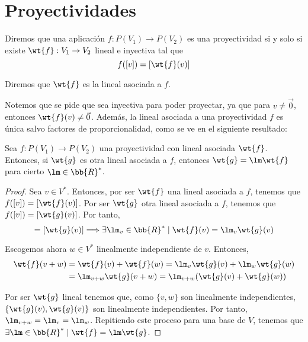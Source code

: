 \section{Proyectividades}

\begin{figure}[H]
    \centering
\end{figure}

\begin{definicion}[Proyectividad]
    Diremos que una aplicación $f:P(V_1)\to P(V_2)$ es una proyectividad si y solo si existe $\wt{f}:V_1\to V_2$ lineal e inyectiva tal que
    \begin{equation*}
        f([v])=[\wt{f}(v)]
    \end{equation*}

    Diremos que $\wt{f}$ es la lineal asociada a $f$.
\end{definicion}
Notemos que se pide que sea inyectiva para poder proyectar, ya que para $v\neq \vec{0}$, entonces $\wt{f}(v)\neq \vec{0}$.
Además, la lineal asociada a una proyectividad $f$ es única salvo factores de proporcionalidad, como se ve en el siguiente resultado:
\begin{prop}
    Sea $f:P(V_1)\to P(V_2)$ una proyectividad con lineal asociada $\wt{f}$.
    Entonces, si $\wt{g}$ es otra lineal asociada a $f$, entonces $\wt{g}=\lm \wt{f}$ para cierto $\lm \in \bb{R}^\ast$.
\end{prop}
\begin{proof}
    Sea $v\in V^\ast$. Entonces, por ser $\wt{f}$ una lineal asociada a $f$, tenemos que $f([v])=[\wt{f}(v)]$.
    Por ser $\wt{g}$ otra lineal asociada a $f$, tenemos que $f([v])=[\wt{g}(v)]$. Por tanto,
    \begin{equation*}
        [\wt{f}(v)]=[\wt{g}(v)] \Longrightarrow \exists \lm_v \in \bb{R}^\ast \mid \wt{f}(v)=\lm_v \wt{g}(v)
    \end{equation*}

    Escogemos ahora $w\in V^\ast$ linealmente independiente de $v$. Entonces,
    \begin{equation*}
        \begin{split}
            \wt{f}(v+w) &= \wt{f}(v) + \wt{f}(w) = \lm_v \wt{g}(v) + \lm _w \wt{g}(w)\\
            &= \lm_{v+w} \wt{g}(v+w) = \lm_{v+w} (\wt{g}(v) + \wt{g}(w))
        \end{split}
    \end{equation*}

    Por ser $\wt{g}$ lineal tenemos que, como $\{v,w\}$ son linealmente independientes, $\{\wt{g}(v), \wt{g}(v)\}$ son linealmente independientes. Por tanto, $\lm_{v+w} = \lm_v = \lm_w$.
    Repitiendo este proceso para una base de $V$, tenemos que $\exists \lm \in \bb{R}^\ast \mid \wt{f}=\lm \wt{g}$.
\end{proof}


